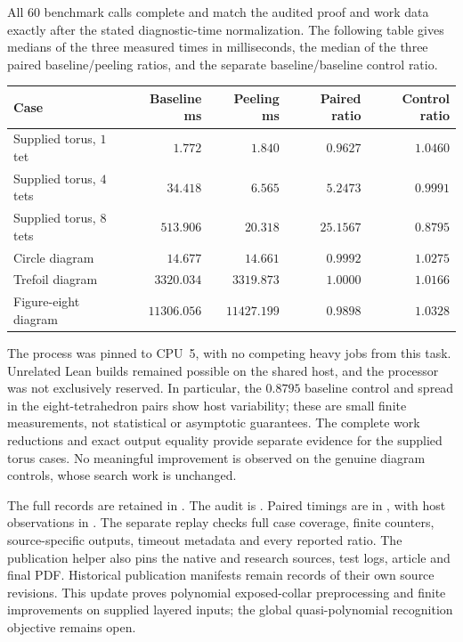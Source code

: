 All $60$ benchmark calls complete and match the audited proof and work
data exactly after the stated diagnostic-time normalization.  The
following table gives medians of the three measured times in
milliseconds, the median of the three paired baseline/peeling ratios,
and the separate baseline/baseline control ratio.
\begin{center}
\begin{tabular}{lrrrr}
Case & Baseline ms & Peeling ms & Paired ratio & Control ratio\\
\hline
Supplied torus, $1$ tet & $1.772$ & $1.840$ & $0.9627$ & $1.0460$\\
Supplied torus, $4$ tets & $34.418$ & $6.565$ & $5.2473$ & $0.9991$\\
Supplied torus, $8$ tets & $513.906$ & $20.318$ & $25.1567$ & $0.8795$\\
Circle diagram & $14.677$ & $14.661$ & $0.9992$ & $1.0275$\\
Trefoil diagram & $3320.034$ & $3319.873$ & $1.0000$ & $1.0166$\\
Figure-eight diagram & $11306.056$ & $11427.199$ & $0.9898$ & $1.0328$
\end{tabular}
\end{center}
The process was pinned to CPU~5, with no competing heavy jobs from this
task.  Unrelated Lean builds remained possible on the shared host, and
the processor was not exclusively reserved.  In particular, the
$0.8795$ baseline control and spread in the eight-tetrahedron pairs
show host variability; these are small finite measurements, not
statistical or asymptotic guarantees.  The complete work reductions
and exact output equality provide separate evidence for the supplied
torus cases.  No meaningful improvement is observed on the genuine
diagram controls, whose search work is unchanged.

The full records are retained in .
The audit is .
Paired timings are in , with host
observations in .
The separate replay checks full case coverage, finite counters,
source-specific outputs, timeout metadata and every reported ratio.
The publication helper 
also pins the native and research sources, test logs, article and final
PDF.  Historical publication manifests remain records of their own
source revisions.  This update proves polynomial exposed-collar
preprocessing and finite improvements on supplied layered inputs;
the global quasi-polynomial recognition objective remains open.
